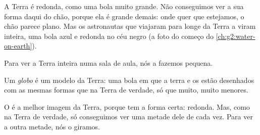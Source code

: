 A Terra é redonda, como uma bola muito grande. Não conseguimos ver a sua
forma daqui do chão, porque ela é grande demais: onde quer que estejamos,
o chão parece plano. Mas os astronautas que viajaram para longe da Terra a
viram inteira, uma bola azul e redonda no céu negro (a foto do começo do
\cref{ch:g2:water-on-earth}).

Para ver a Terra inteira numa sala de aula, nós a fazemos pequena.

\begin{definition}[Globo]\label{def:g3:continents-and-oceans:globe}
Um \emph{globo} é um modelo da Terra: uma bola em que a terra
e os  estão desenhados com as mesmas formas que na Terra de verdade,
só que muito, muito menores.
\end{definition}

O  é a melhor imagem da Terra, porque tem a forma certa: redonda. Mas,
como na Terra de verdade, só conseguimos ver uma metade dele de cada vez.
Para ver a outra metade, nós o giramos.

